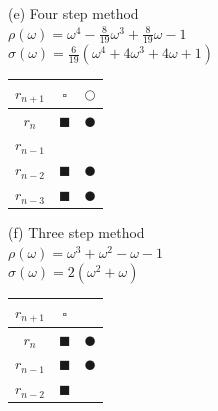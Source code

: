 \documentclass[final,oneside,onecolumn]{article}
\begin{document}
\begin{enumerate}
	{(e) Four step method \\
	$\rho(\omega) = \omega^4 - \frac{8}{19}\omega^3 + \frac{8}{19}\omega - 1$\\
	$\sigma(\omega) = \frac{6}{19} ( \omega^4 +4\omega^3 + 4\omega + 1)$\\
	\begin{tabular}{c|cc}
		$r_{n+1}$ & $\square$ & $\Circle$ \\ \hline
		$r_{n}$   & $\blacksquare$ & $\CIRCLE$\\
		$r_{n-1}$ &  & \\
		$r_{n-2}$ & $\blacksquare$ & $\CIRCLE$ \\
		$r_{n-3}$ & $\blacksquare$ & $\CIRCLE$ \\
	\end{tabular}}
\bigbreak
	{(f) Three step method \\
	$\rho(\omega) = \omega^3 + \omega^2 - \omega - 1$\\
	$\sigma(\omega) = 2 ( \omega^2 + \omega)$\\
	\begin{tabular}{c|cc}
		$r_{n+1}$ & $\square$ & \\ \hline
		$r_{n}$   & $\blacksquare$ & $\CIRCLE$\\
		$r_{n-1}$ & $\blacksquare$ & $\CIRCLE$\\
		$r_{n-2}$ & $\blacksquare$ &  \\
	\end{tabular}}
		


\end{enumerate}
\end{document}
